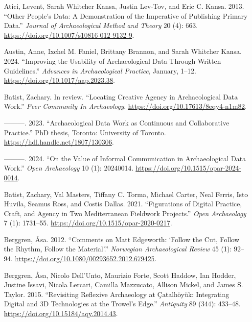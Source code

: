 \documentclass[
]{article}
\newlength{\cslhangindent}
\newenvironment{CSLReferences}[2] %
 {\begin{list}{}{%
  \setlength{\itemindent}{0pt}
  \setlength{\leftmargin}{0pt}
  \setlength{\parsep}{0pt}
  \ifodd #1
   \setlength{\leftmargin}{\cslhangindent}
   \setlength{\itemindent}{-1\cslhangindent}
  \fi
  \setlength{\itemsep}{#2\baselineskip}}}
 {\end{list}}
\begin{document}
\label{refs}
\begin{CSLReferences}{1}{0}
Atici, Levent, Sarah Whitcher Kansa, Justin Lev-Tov, and Eric C. Kansa.
2013. {``Other {People}'s {Data}: {A Demonstration} of the {Imperative}
of {Publishing Primary Data}.''} \emph{Journal of Archaeological Method
and Theory} 20 (4): 663.
\url{https://doi.org/10.1007/s10816-012-9132-9}.

Austin, Anne, Ixchel M. Faniel, Brittany Brannon, and Sarah Whitcher
Kansa. 2024. {``Improving the {Usability} of {Archaeological Data}
Through {Written Guidelines}.''} \emph{Advances in Archaeological
Practice}, January, 1--12. \url{https://doi.org/10.1017/aap.2023.38}.

Batist, Zachary. In review. {``Locating Creative Agency in
Archaeological Data Work.''} \emph{Peer Community In Archaeology}.
\url{https://doi.org/10.17613/8eqy4-n1m82}.

---------. 2023. {``Archaeological Data Work as Continuous and
Collaborative Practice.''} PhD thesis, Toronto: University of Toronto.
\url{https://hdl.handle.net/1807/130306}.

---------. 2024. {``On the {Value} of {Informal Communication} in
{Archaeological Data Work}.''} \emph{Open Archaeology} 10 (1): 20240014.
\url{https://doi.org/10.1515/opar-2024-0014}.

Batist, Zachary, Val Masters, Tiffany C. Torma, Michael Carter, Neal
Ferris, Isto Huvila, Seamus Ross, and Costis Dallas. 2021.
{``Figurations of {Digital Practice}, {Craft}, and {Agency} in {Two
Mediterranean Fieldwork Projects}.''} \emph{Open Archaeology} 7 (1):
1731--55. \url{https://doi.org/10.1515/opar-2020-0217}.

Berggren, Åsa. 2012. {``Comments on {Matt Edgeworth}: {`{Follow} the
{Cut}, {Follow} the {Rhythm}, {Follow} the {Material}'}.''}
\emph{Norwegian Archaeological Review} 45 (1): 92--94.
\url{https://doi.org/10.1080/00293652.2012.679425}.

Berggren, Åsa, Nicolo Dell'Unto, Maurizio Forte, Scott Haddow, Ian
Hodder, Justine Issavi, Nicola Lercari, Camilla Mazzucato, Allison
Mickel, and James S. Taylor. 2015. {``Revisiting Reflexive Archaeology
at {Çatalhöyük}: {Integrating} Digital and {3D} Technologies at the
Trowel's Edge.''} \emph{Antiquity} 89 (344): 433--48.
\url{https://doi.org/10.15184/aqy.2014.43}.


\end{CSLReferences}
\end{document}
